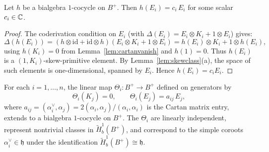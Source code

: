 \begin{lemma}
\label{lem:skewprim}
Let $h$ be a bialgebra $1$-cocycle on $B^+$. Then $h(E_i) = c_i \, E_i$ for some scalar $c_i \in \mathbb{C}$.
\end{lemma}

\begin{proof}
The coderivation condition on $E_i$ (with $\Delta(E_i) = E_i \otimes K_i + 1 \otimes E_i$) gives:
\[
\Delta(h(E_i)) = (h \otimes \mathrm{id} + \mathrm{id} \otimes h)(E_i \otimes K_i + 1 \otimes E_i) = h(E_i) \otimes K_i + 1 \otimes h(E_i),
\]
using $h(K_i) = 0$ from Lemma~\ref{lem:cartanvanish} and $h(1) = 0$. Thus $h(E_i)$ is a $(1, K_i)$-skew-primitive element. By Lemma~\ref{lem:skewclass}(a), the space of such elements is one-dimensional, spanned by $E_i$. Hence $h(E_i) = c_i E_i$.
\end{proof}

\begin{lemma}
\label{lem:euler}
For each $i = 1, \ldots, n$, the linear map $\Theta_i \colon B^+ \to B^+$ defined on generators by
\[
\Theta_i(K_j) = 0, \qquad \Theta_i(E_j) = a_{ij} \, E_j,
\]
where $a_{ij} = (\alpha_i^\vee, \alpha_j) = 2(\alpha_i, \alpha_j)/(\alpha_i, \alpha_i)$ is the Cartan matrix entry, extends to a bialgebra $1$-cocycle on $B^+$. The $\Theta_i$ are linearly independent, represent nontrivial classes in $\tilde{H}^1_b(B^+)$, and correspond to the simple coroots $\alpha_i^\vee \in \mathfrak{h}$ under the identification $\tilde{H}^1_b(B^+) \cong \mathfrak{h}$.
\end{lemma}

